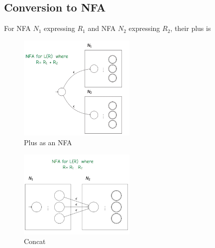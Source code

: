 \documentclass[a4paper]{article}
\theoremstyle{plain}
\theoremstyle{definition}
\newtheorem{defn}{Definition}[section]
\theoremstyle{remark}
\begin{document}
\subsection{Conversion to NFA}
\begin{tcolorbox}[colback=black!3!white,colframe=black!60!white,title=\begin{defn}Union / Plus \label{Union / Plus}\end{defn}]
For NFA $N_1$ expressing $R_1$ and NFA $N_2$ expressing $R_2$, their plus is
\begin{figure}[H]
	\centering
	\includegraphics[width=0.5\textwidth]{two.png}
	\caption{Plus as an NFA}
	\label{fig:two-png}
\end{figure}
\end{tcolorbox}
\begin{tcolorbox}[colback=black!3!white,colframe=black!60!white,title=\begin{defn}Concat \label{Concat}\end{defn}]
\begin{figure}[H]
	\centering
	\includegraphics[width=0.5\textwidth]{three.png}
	\caption{Concat}
	\label{fig:three-png}
\end{figure}
\end{tcolorbox}
\end{document}
